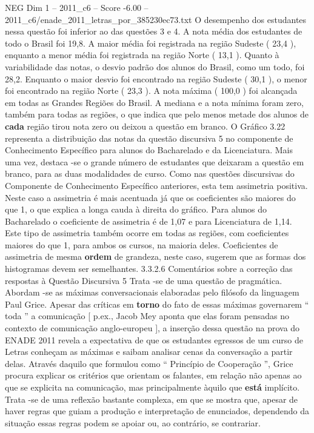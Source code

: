 \begin{textsample}{NEG Dim 1 – 2011\_c6 – Score -6.00 – 2011\_c6/enade\_2011\_letras\_por\_385230ec73.txt}
O desempenho dos estudantes nessa questão foi inferior ao das questões 3 e 4.
A nota média dos estudantes de todo o Brasil foi 19,8.
A maior média foi registrada na região Sudeste ( 23,4 ), enquanto a menor média foi registrada na região Norte ( 13,1 ).
Quanto à variabilidade das notas, o desvio padrão dos alunos do Brasil, como um todo, foi 28,2.
Enquanto o maior desvio foi encontrado na região Sudeste ( 30,1 ), o menor foi encontrado na região Norte ( 23,3 ).
A nota máxima ( 100,0 ) foi alcançada em todas as Grandes Regiões do Brasil.
A mediana e a nota mínima foram zero, também para todas as regiões, o que indica que pelo menos metade dos alunos de \textbf{cada} região tirou nota zero ou deixou a questão em branco.
O Gráfico 3.22 representa a distribuição das notas da questão discursiva 5 no componente de Conhecimento Específico para alunos do Bacharelado e da Licenciatura.
Mais uma vez, destaca -se o grande número de estudantes que deixaram a questão em branco, para as duas modalidades de curso.
Como nas questões discursivas do Componente de Conhecimento Específico anteriores, esta tem assimetria positiva.
Neste caso a assimetria é mais acentuada já que os coeficientes são maiores do que 1, o que explica a longa cauda à direita do gráfico.
Para alunos do Bacharelado o coeficiente de assimetria é de 1,07 e para Licenciatura de 1,14.
Este tipo de assimetria também ocorre em todas as regiões, com coeficientes maiores do que 1, para ambos os cursos, na maioria deles.
Coeficientes de assimetria de mesma \textbf{ordem} de grandeza, neste caso, sugerem que as formas dos histogramas devem ser semelhantes. 3.3.2.6 Comentários sobre a correção das respostas à Questão Discursiva 5 Trata -se de uma questão de pragmática.
Abordam -se as máximas conversacionais elaboradas pelo filósofo da linguagem Paul Grice.
Apesar das críticas em \textbf{torno} do fato de essas máximas governarem “ toda ” a comunicação [ p.ex., Jacob Mey aponta que elas foram pensadas no contexto de comunicação anglo-europeu ], a inserção dessa questão na prova do ENADE 2011 revela a expectativa de que os estudantes egressos de um curso de Letras conheçam as máximas e saibam analisar cenas da conversação a partir delas.
Através daquilo que formulou como “ Princípio de Cooperação ”, Grice procura explicar os critérios que orientam os falantes, em relação não apenas ao que se explicita na comunicação, mas principalmente àquilo que \textbf{está} implícito.
Trata -se de uma reflexão bastante complexa, em que se mostra que, apesar de haver regras que guiam a produção e interpretação de enunciados, dependendo da situação essas regras podem se apoiar ou, ao contrário, se contrariar.

\end{textsample}

